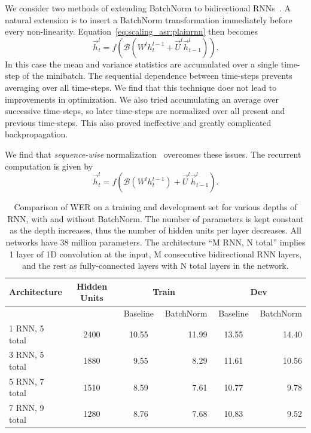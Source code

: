 We consider two methods of extending BatchNorm to bidirectional
RNNs~\cite{laurent2016}. A natural extension is to insert a BatchNorm
transformation immediately before every non-linearity.
Equation~\ref{eq:scaling_asr:plainrnn} then becomes 
\begin{equation*}
    \overrightarrow{h}^l_t =
        f( \mathcal{B}( W^l h^{l-1}_t + \overrightarrow{U}^l \overrightarrow{h}^l_{t-1} )).  
\end{equation*}
In this case the mean and variance statistics are accumulated over a single
time-step of the minibatch. The sequential dependence between time-steps
prevents averaging over all time-steps. We find that this technique does not
lead to improvements in optimization. We also tried accumulating an average
over successive time-steps, so later time-steps are normalized over all present
and previous time-steps. This also proved ineffective and greatly complicated
backpropagation.

We find that \emph{sequence-wise} normalization~\cite{laurent2016} overcomes
these issues. The recurrent computation is given by
\begin{equation*}
    \overrightarrow{h}^l_t = f( \mathcal{B}( W^l h^{l-1}_t) + \overrightarrow{U}^l \overrightarrow{h}^l_{t-1}).  
\end{equation*}

\begin{table}
\centering
\begin{tabular}{l  c  r r r  r  r r r  r}
\toprule
Architecture & Hidden Units & \multicolumn{4}{c}{Train} & \multicolumn{4}{c}{Dev}  \\
\midrule
     &  & \multicolumn{3}{c}{Baseline} & BatchNorm & \multicolumn{3}{c}{Baseline} & BatchNorm \\
\midrule
1 RNN, 5 total   & 2400 & & 10.55 & & 11.99 & & 13.55 & & 14.40 \\
3 RNN, 5 total   & 1880 & & 9.55  & & 8.29  & & 11.61 & & 10.56 \\
5 RNN, 7 total   & 1510 & & 8.59  & & 7.61  & & 10.77 & & 9.78 \\
7 RNN, 9 total   & 1280 & & 8.76  & & 7.68  & & 10.83 & & 9.52 \\
\bottomrule
\end{tabular}
\caption{Comparison of WER on a training and development set for various depths
         of RNN, with and without BatchNorm. The number of parameters is kept
         constant as the depth increases, thus the number of hidden units per layer
         decreases. All networks have 38 million parameters. The architecture ``M
         RNN, N total'' implies 1 layer of 1D convolution at the input, M
         consecutive bidirectional RNN layers, and the rest as fully-connected
         layers with N total layers in the network.}
\label{table:scaling_asr:batch_norm}
\end{table}

